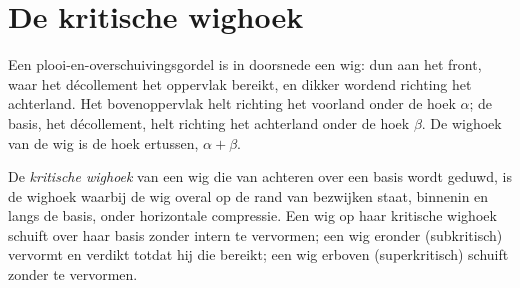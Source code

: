 \begin{omfigure}
\par{}\label{fig:b3:orogenic-wedges:duplex}
\end{omfigure}


\section{De kritische wighoek}\label{sec:b3:orogenic-wedges:taper}

Een plooi-en-overschuivingsgordel is in doorsnede een wig: dun aan het front, waar
het décollement het oppervlak bereikt, en dikker wordend richting het achterland.
Het bovenoppervlak helt richting het voorland onder de hoek $\alpha$; de
basis, het décollement, helt richting het achterland onder de hoek $\beta$. De
wighoek van de wig is de hoek ertussen, $\alpha + \beta$.

\begin{definition}\label{def:b3:orogenic-wedges:critical-taper}
De \emph{kritische wighoek} van een wig die van achteren
over een basis wordt geduwd, is de wighoek waarbij de wig overal op de rand
van bezwijken staat, binnenin en langs de basis, onder horizontale compressie. Een wig op
haar kritische wighoek schuift over haar basis zonder intern te vervormen; een
wig eronder (subkritisch) vervormt en verdikt totdat hij die bereikt; een
wig erboven (superkritisch) schuift zonder te vervormen.
\end{definition}

